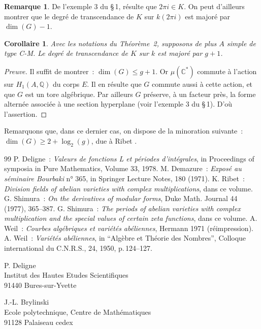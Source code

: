 \documentclass[12pt,a4paper]{article}
\theoremstyle{plain}
\newtheorem{corollary}{Corollaire}
\theoremstyle{definition}
\newtheorem{remark}{Remarque}
\theoremstyle{remark}
\newcommand{\QQ}{\mathbb{Q}}
\newcommand{\CC}{\mathbb{C}}
\providecommand{\CC}{\mathbb{C}}
\providecommand{\QQ}{\mathbb{Q}}
\begin{document}
\begin{remark}
De l'exemple 3 du \S\,1, résulte que $2\pi i \in K$. On peut d'ailleurs montrer que le degré de transcendance de $K$ sur $k(2\pi i)$ est majoré par $\dim(G) - 1$.
\end{remark}

\begin{corollary}
Avec les notations du Théorème~2, supposons de plus $A$ simple de type C-M. Le degré de transcendance de $K$ sur $k$ est majoré par $g + 1$.
\end{corollary}

\begin{proof}[Preuve]
Il suffit de montrer~: $\dim(G) \leq g + 1$. Or $\mu(\CC^*)$ commute à l'action sur $H_1(A, \QQ)$ du corps $E$. Il en résulte que $G$ commute aussi à cette action, et que $G$ est un tore algébrique. Par ailleurs $G$ préserve, à un facteur près, la forme alternée associée à une section hyperplane (voir l'exemple 3 du \S\,1). D'où l'assertion.
\end{proof}

Remarquons que, dans ce dernier cas, on dispose de la minoration suivante~: $\dim(G) \geq 2 + \log_2(g)$, due à Ribet \cite{Ribet}.

\begin{thebibliography}{99}
 P. Deligne~: \textit{Valeurs de fonctions L et périodes d'intégrales}, in Proceedings of symposia in Pure Mathematics, Volume 33, 1978.
 M. Demazure~: \textit{Exposé au séminaire Bourbaki} n° 365, in Springer Lecture Notes, 180 (1971).
 K. Ribet~: \textit{Division fields of abelian varieties with complex multiplications}, dans ce volume.
 G. Shimura~: \textit{On the derivatives of modular forms}, Duke Math. Journal 44 (1977), 365--387.
 G. Shimura~: \textit{The periods of abelian varieties with complex multiplication and the special values of certain zeta functions}, dans ce volume.
 A. Weil~: \textit{Courbes algébriques et variétés abéliennes}, Hermann 1971 (réimpression).
 A. Weil~: \textit{Variétés abéliennes}, in ``Algèbre et Théorie des Nombres'', Colloque international du C.N.R.S., 24, 1950, p.\,124--127.
\end{thebibliography}

\vfill

\begin{flushright}
\begin{minipage}{0.5\textwidth}
\small
P. Deligne\\
Institut des Hautes Etudes Scientifiques\\
91440 Bures-sur-Yvette
\end{minipage}
\end{flushright}

\begin{flushright}
\begin{minipage}{0.5\textwidth}
\small
J.-L. Brylinski\\
Ecole polytechnique, Centre de Mathématiques\\
91128 Palaiseau cedex
\end{minipage}
\end{flushright}
\end{document}
